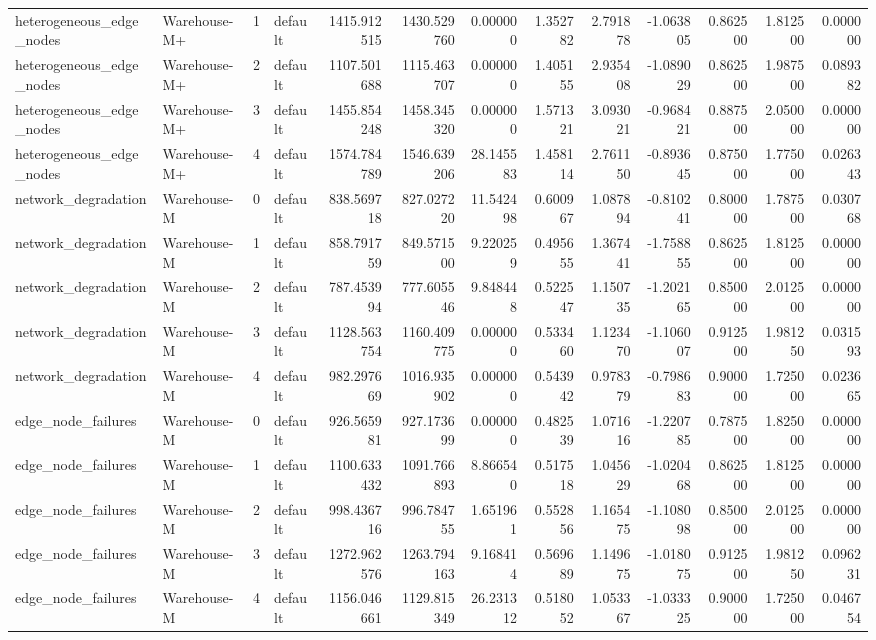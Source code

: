 \begin{tabular}{llrlrrrrrrrrr}
heterogeneous\_edge\_nodes & Warehouse-M+ & 1 & default & 1415.912515 & 1430.529760 & 0.000000 & 1.352782 & 2.791878 & -1.063805 & 0.862500 & 1.812500 & 0.000000 \\
heterogeneous\_edge\_nodes & Warehouse-M+ & 2 & default & 1107.501688 & 1115.463707 & 0.000000 & 1.405155 & 2.935408 & -1.089029 & 0.862500 & 1.987500 & 0.089382 \\
heterogeneous\_edge\_nodes & Warehouse-M+ & 3 & default & 1455.854248 & 1458.345320 & 0.000000 & 1.571321 & 3.093021 & -0.968421 & 0.887500 & 2.050000 & 0.000000 \\
heterogeneous\_edge\_nodes & Warehouse-M+ & 4 & default & 1574.784789 & 1546.639206 & 28.145583 & 1.458114 & 2.761150 & -0.893645 & 0.875000 & 1.775000 & 0.026343 \\
network\_degradation & Warehouse-M & 0 & default & 838.569718 & 827.027220 & 11.542498 & 0.600967 & 1.087894 & -0.810241 & 0.800000 & 1.787500 & 0.030768 \\
network\_degradation & Warehouse-M & 1 & default & 858.791759 & 849.571500 & 9.220259 & 0.495655 & 1.367441 & -1.758855 & 0.862500 & 1.812500 & 0.000000 \\
network\_degradation & Warehouse-M & 2 & default & 787.453994 & 777.605546 & 9.848448 & 0.522547 & 1.150735 & -1.202165 & 0.850000 & 2.012500 & 0.000000 \\
network\_degradation & Warehouse-M & 3 & default & 1128.563754 & 1160.409775 & 0.000000 & 0.533460 & 1.123470 & -1.106007 & 0.912500 & 1.981250 & 0.031593 \\
network\_degradation & Warehouse-M & 4 & default & 982.297669 & 1016.935902 & 0.000000 & 0.543942 & 0.978379 & -0.798683 & 0.900000 & 1.725000 & 0.023665 \\
edge\_node\_failures & Warehouse-M & 0 & default & 926.565981 & 927.173699 & 0.000000 & 0.482539 & 1.071616 & -1.220785 & 0.787500 & 1.825000 & 0.000000 \\
edge\_node\_failures & Warehouse-M & 1 & default & 1100.633432 & 1091.766893 & 8.866540 & 0.517518 & 1.045629 & -1.020468 & 0.862500 & 1.812500 & 0.000000 \\
edge\_node\_failures & Warehouse-M & 2 & default & 998.436716 & 996.784755 & 1.651961 & 0.552856 & 1.165475 & -1.108098 & 0.850000 & 2.012500 & 0.000000 \\
edge\_node\_failures & Warehouse-M & 3 & default & 1272.962576 & 1263.794163 & 9.168414 & 0.569689 & 1.149675 & -1.018075 & 0.912500 & 1.981250 & 0.096231 \\
edge\_node\_failures & Warehouse-M & 4 & default & 1156.046661 & 1129.815349 & 26.231312 & 0.518052 & 1.053367 & -1.033325 & 0.900000 & 1.725000 & 0.046754 \\

\end{tabular}

